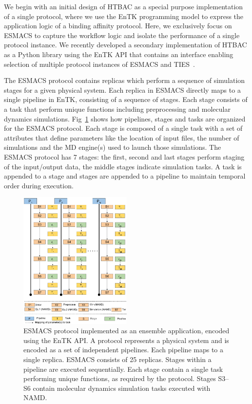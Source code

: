 We begin with an initial design of HTBAC as a special purpose implementation of
a single protocol, where we use the EnTK programming model to express the 
application logic of a binding affinity protocol. Here, we exclusively focus on 
ESMACS to capture the workflow logic and isolate the performance of a 
single protocol instance. We recently developed a secondary implementation of 
HTBAC as a Python library using the EnTK API that contains an interface enabling 
selection of multiple protocol instances of ESMACS and TIES~\cite{dakka}. 

The ESMACS protocol contains replicas 
 which
perform a sequence of simulation stages for a given physical system. Each
replica in ESMACS directly maps to a single pipeline in EnTK, consisting of a
sequence of stages. Each stage consists of a task that perform unique
functions including preprocessing and molecular dynamics simulations.
Fig~\ref{figure:HTBAC} shows how pipelines, stages and tasks are organized for
the ESMACS protocol. Each stage is composed of a single task with a set of
attributes that define parameters like the location of input files, the number
of simulations and the MD engine(s) used to launch those simulations. The
ESMACS protocol has 7 stages: the first, second and last stages perform
staging of the input/output data, the middle stages indicate simulation tasks.
A task is appended to a stage and stages are appended to a pipeline to
maintain temporal order during execution.

\begin{figure}
\centering
  \includegraphics[width=0.5\textwidth]{FIGURES/HTBAC_Workflow_ESMACS.pdf}
  \caption{ESMACS protocol implemented as an ensemble
  application, encoded using the EnTK
  API. A protocol represents a physical system and is 
  encoded as a set of independent pipelines. Each pipeline maps to a single
  replica. ESMACS consists of 25 replicas. Stages within a pipeline
  are executed sequentially. Each stage contain a single task performing unique
  functions, as required by the protocol. Stages S3--S6 contain molecular
  dynamics simulation tasks executed with NAMD\@.}
  \label{figure:HTBAC}
\end{figure}

